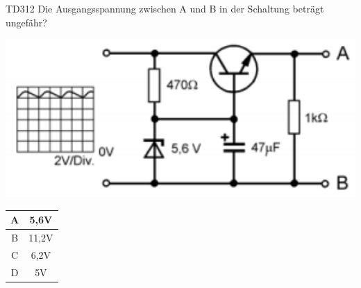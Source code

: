 \begin{frame}
    \begin{center} \Large
        \begin{block}{TD312}
		\large Die Ausgangsspannung zwischen A und B in der Schaltung beträgt ungefähr?\\
		\begin{center}
		\includegraphics[width=1\textwidth]{a17/TD312.png}\\
		\end{center}
    	\end{block}
        \begin{tabular}{|c|c|}
        \hline
        A & 5,6V \\ \hline
        B & 11,2V \\ \hline
        C & 6,2V \\ \hline
        D & 5V \\ \hline
        \end{tabular}
    \end{center}
\end{frame}
